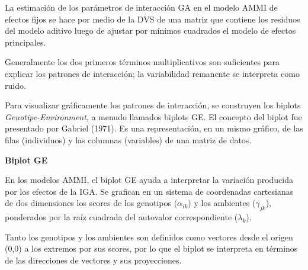 La estimación de los parámetros de interacción GA en el modelo AMMI de efectos fijos se hace por medio de la DVS de una matriz que contiene
los residuos del modelo aditivo luego de ajustar por mínimos cuadrados el modelo de efectos principales.

Generalmente los dos primeros términos multiplicativos son suficientes para explicar los patrones de interacción; la variabilidad remanente se interpreta como ruido. 

Para visualizar gráficamente los patrones de interacción, se construyen los biplots \emph{Genotipe-Environment}, a menudo llamados biplots GE. El concepto del biplot fue presentado por Gabriel (1971). Es una representación, en un mismo gráfico, de las filas (individuos) y las columnas (variables) de una matriz de datos. 

\textbf{Biplot GE}

En los modelos AMMI, el biplot GE ayuda a interpretar la variación producida por los efectos de la IGA. Se grafican en un sistema de coordenadas cartesianas de dos dimensiones los scores de los genotipos ($\alpha_{ik}$) y los ambientes ($\gamma_{jk}$), ponderados por la raíz cuadrada del autovalor correspondiente ($\lambda_k$).

Tanto los genotipos y los ambientes son definidos como vectores desde el origen (0,0) a los extremos por sus scores, por lo que el biplot se interpreta en términos de las direcciones de vectores y sus proyecciones.\\


